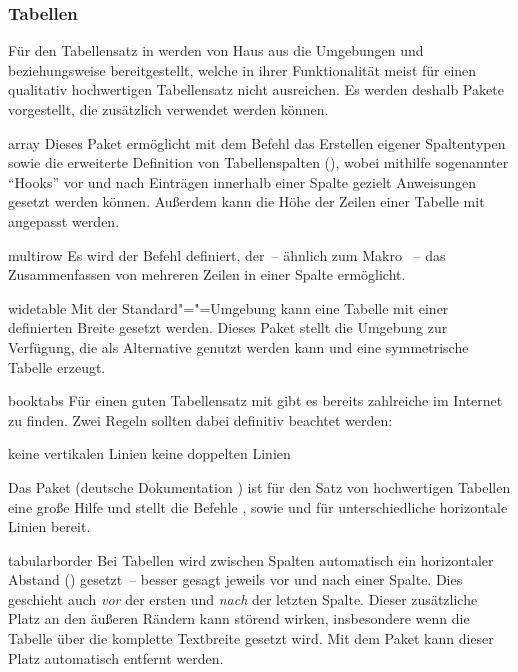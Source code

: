 \subsubsection{Tabellen}
Für den Tabellensatz in  werden von Haus aus die Umgebungen 
 und  beziehungsweise 
 bereitgestellt, welche in ihrer Funktionalität meist 
für einen qualitativ hochwertigen Tabellensatz nicht ausreichen. Es werden 
deshalb Pakete vorgestellt, die zusätzlich verwendet werden können. 
\begin{packages}
\item[array]
  Dieses Paket ermöglicht mit dem Befehl  das Erstellen 
  eigener Spaltentypen sowie die erweiterte Definition von Tabellenspalten
  (\PValue{>\{\dots\}}\PValue{<\{\dots\}}), wobei mithilfe 
  sogenannter \enquote{Hooks} vor und nach Einträgen innerhalb einer Spalte 
  gezielt Anweisungen gesetzt werden können. Außerdem kann die Höhe der Zeilen 
  einer Tabelle mit  angepasst werden.  
\item[multirow]
  Es wird der Befehl  definiert, der~-- ähnlich zum Makro 
  ~-- das Zusammenfassen von mehreren Zeilen in einer 
  Spalte ermöglicht.
\item[widetable]
  Mit der Standard"="=Umgebung  kann eine 
  Tabelle mit einer definierten Breite gesetzt werden. Dieses Paket stellt die 
  Umgebung  zur Verfügung, die als Alternative genutzt 
  werden kann und eine symmetrische Tabelle erzeugt.
\item[booktabs]
  Für einen guten Tabellensatz mit  gibt es bereits zahlreiche 
   im 
  Internet zu finden. Zwei Regeln sollten dabei definitiv beachtet werden:
  \begin{enumerate}[itemindent=0pt,labelwidth=*,labelsep=1em,label=\Roman*.]
  \itempackages keine vertikalen Linien
  \itempackages keine doppelten Linien
  \end{enumerate}
  Das Paket  (deutsche Dokumentation ) 
  ist für den Satz von hochwertigen Tabellen eine große Hilfe und stellt die 
  Befehle ,  sowie  und 
   für unterschiedliche horizontale Linien bereit.
\item[tabularborder]
  Bei Tabellen wird zwischen Spalten automatisch ein horizontaler Abstand 
  () gesetzt~-- besser gesagt jeweils vor und nach einer 
  Spalte. Dies geschieht auch \emph{vor} der ersten und \emph{nach} der letzten 
  Spalte. Dieser zusätzliche Platz an den äußeren Rändern kann störend wirken, 
  insbesondere wenn die Tabelle über die komplette Textbreite gesetzt wird. Mit 
  dem Paket  kann dieser Platz automatisch entfernt 
  werden.
  

\end{packages}
